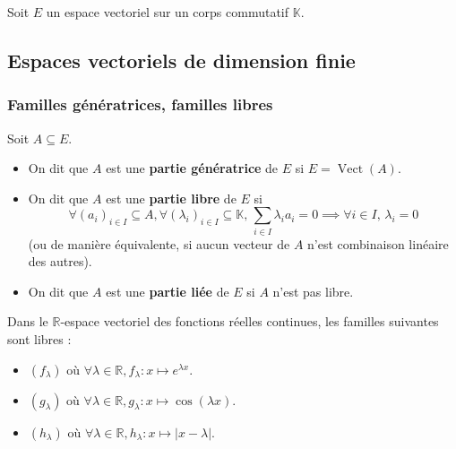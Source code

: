 



  Soit $E$ un espace vectoriel sur un corps commutatif $\mathbb{K}$.

  \subsection{Espaces vectoriels de dimension finie}

  \subsubsection{Familles génératrices, familles libres}


  \begin{definition}
    Soit $A \subseteq E$.
    \begin{itemize}
      \item On dit que $A$ est une \textbf{partie génératrice} de $E$ si $E = \operatorname{Vect}(A)$.
      \item On dit que $A$ est une \textbf{partie libre} de $E$ si
      \[ \forall (a_i)_{i \in I} \subseteq A, \forall (\lambda_i)_{i \in I} \subseteq \mathbb{K}, \, \sum_{i \in I} \lambda_i a_i = 0 \implies \forall i \in I, \, \lambda_i = 0 \]
      (ou de manière équivalente, si aucun vecteur de $A$ n'est combinaison linéaire des autres).
      \item On dit que $A$ est une \textbf{partie liée} de $E$ si $A$ n'est pas libre.
    \end{itemize}
  \end{definition}

  \begin{example}
    Dans le $\mathbb{R}$-espace vectoriel des fonctions réelles continues, les familles suivantes sont libres :
    \begin{itemize}
      \item $(f_\lambda)$ où $\forall \lambda \in \mathbb{R}, f_\lambda : x \mapsto e^{\lambda x}$.
      \item $(g_\lambda)$ où $\forall \lambda \in \mathbb{R}, g_\lambda : x \mapsto \cos(\lambda x)$.
      \item $(h_\lambda)$ où $\forall \lambda \in \mathbb{R}, h_\lambda : x \mapsto |x - \lambda|$.
    \end{itemize}
  \end{example}


